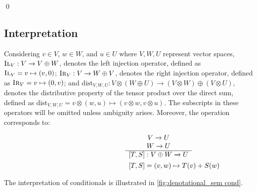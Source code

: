   \qed

\subsection{Interpretation}
Considering  $v \in V$, $w \in W$, and $u \in U$ where $V, W, U$ represent vector spaces, $\textsc{Il}_{V}: V \xrightarrow{} V\oplus W$, denotes the left injection operator, defined as $\textsc{Il}_{V}= v \mapsto (v,0) $; $\textsc{Ir}_{V}: V \xrightarrow{} W \oplus V$, denotes the right injection operator, defined as $\textsc{Ir}_{V}= v \mapsto (0,v) $; and $\text{dist}_{V, W,U}: V \otimes  \left(W \oplus U\right) \xrightarrow{} \left(V \otimes W\right) \oplus \left(V \otimes U\right)$, denotes the distributive property of the tensor product over the direct sum, defined as $\text{dist}_{V, W,U} =  v \otimes  \left(w, u\right) \mapsto \left(v \otimes w, v \otimes u\right)$. The subscripts in these operators will be omitted unless ambiguity arises. Moreover, the operation  corresponds to:
\begin{figure} [H]
\begin{equation}
\begin{split}
\begin{aligned}
\hspace{95pt}&
\begin{minipage}[t]{0.3\textwidth}
$\begin{array}{c}
     V  \xrightarrow{} U  \\
      W \xrightarrow{} U  \\
    \hline
  [T,S]: V \oplus W \xrightarrow{} U
\end{array}
$
\end{minipage} \\
\hspace{95pt}&
\begin{minipage}[t]{0.3\textwidth}
$\begin{array}{c}
  [T,S] = (v,w) \mapsto T(v)+S(w) 
\end{array}
$
\end{minipage}
\end{aligned}
\end{split}
\end{equation}
\label{fig:either}
\end{figure}

The interpretation of conditionals is illustrated in \autoref{fig:denotational_sem cond}.

